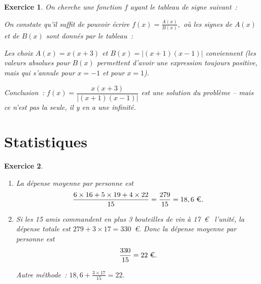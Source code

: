\documentclass[10pt]{article}
\newtheorem{exo}{Exercice}
\begin{document}
\begin{exo}

On cherche une fonction $f$ ayant le tableau de signe suivant~:

\begin{center}
\end{center}

On constate qu'il suffit de pouvoir écrire $f(x)=\frac{A(x)}{B(x)},$ où les signes de $A(x)$ et de $B(x)$ sont donnés par le tableau~:

\begin{center}
\end{center}


\medskip

Les choix $A(x)=x(x+3)$ et $B(x)=|(x+1)(x-1)|$ conviennent (les valeurs absolues pour $B(x)$ permettent d'avoir une expression toujours positive, mais qui s'annule pour $x=-1$ et pour $x=1$).

Conclusion~: $f(x)=\dfrac{x(x+3)}{|(x+1)(x-1)|}$ est une solution du problème -- mais ce n'est pas la seule, il y en a une infinité.


\end{exo}


\section{Statistiques}


\begin{exo}

\begin{enumerate}
\item La dépense moyenne par personne est
\[\frac{6\times 16+5\times 19+4\times 22}{15}=\frac{279}{15}=18,6~\text{\euro}.\]
\item Si les 15 amis commandent en plus 3 bouteilles de vin à 17~\euro~{} l'unité, la dépense totale est $279+3\times 17=330$~\euro. Donc la dépense moyenne par personne est
\[\frac{330}{15}=22~\text{\euro}.\]

\medskip

Autre méthode~: $18,6+\frac{3\times 17}{15}=22.$

\end{enumerate}

\end{exo}
\end{document}
